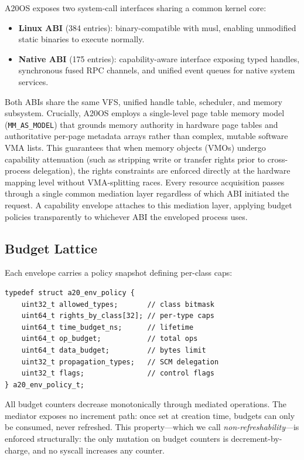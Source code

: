 \documentclass[letterpaper,twocolumn,10pt]{article}
\begin{document}
A20OS exposes two system-call interfaces sharing a common kernel core:

\begin{itemize}
\item \textbf{Linux ABI} (384 entries): binary-compatible with musl,
      enabling unmodified static binaries to execute normally.
\item \textbf{Native ABI} (175 entries): capability-aware interface
      exposing typed handles, synchronous fused RPC channels, and unified
      event queues for native system services.
\end{itemize}

Both ABIs share the same VFS, unified handle table, scheduler, and memory
subsystem.  Crucially, A20OS employs a single-level page table memory model
(\texttt{MM\_AS\_MODEL}) that grounds memory authority in hardware page
tables and authoritative per-page metadata arrays rather than complex,
mutable software VMA lists.  This guarantees that when memory objects (VMOs)
undergo capability attenuation (such as stripping write or transfer rights
prior to cross-process delegation), the rights constraints are enforced directly
at the hardware mapping level without VMA-splitting races.  Every resource
acquisition passes through a single common mediation layer regardless of
which ABI initiated the request.  A capability envelope attaches to this
mediation layer, applying budget policies transparently to whichever ABI the
enveloped process uses.

\subsection{Budget Lattice}

Each envelope carries a policy snapshot defining per-class caps:

\begin{lstlisting}[basicstyle=\footnotesize\ttfamily,columns=flexible]
typedef struct a20_env_policy {
    uint32_t allowed_types;       // class bitmask
    uint64_t rights_by_class[32]; // per-type caps
    uint64_t time_budget_ns;      // lifetime
    uint64_t op_budget;           // total ops
    uint64_t data_budget;         // bytes limit
    uint32_t propagation_types;   // SCM delegation
    uint32_t flags;               // control flags
} a20_env_policy_t;
\end{lstlisting}

All budget counters decrease monotonically through mediated operations.
The mediator exposes no increment path: once set at creation time,
budgets can only be consumed, never refreshed.  This property---which
we call \emph{non-refreshability}---is enforced structurally: the only
mutation on budget counters is decrement-by-charge, and no syscall
increases any counter.
\end{document}
